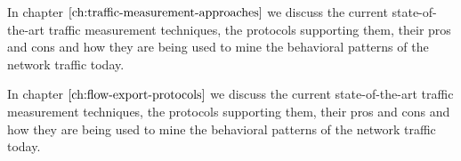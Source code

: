 
\vspace{50pt}

In chapter $\ref{ch:traffic-measurement-approaches}$ we discuss the current state-of-the-art traffic measurement techniques, the protocols supporting them, their pros and cons and how they are being used to mine the behavioral patterns of the network traffic today. 

In chapter $\ref{ch:flow-export-protocols}$ we discuss the current state-of-the-art traffic measurement techniques, the protocols supporting them, their pros and cons and how they are being used to mine the behavioral patterns of the network traffic today. 



